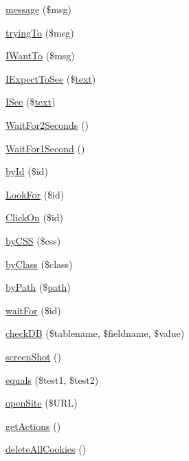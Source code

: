 \begin{DoxyCompactItemize}
\item 
\hyperlink{Tessa_8php_a37ab31c170417027f819bfc053d7cd39}{message} (\$msg)
\item 
\hyperlink{Tessa_8php_aa69ddc0af69161f83509e8b26c683e13}{trying\+To} (\$msg)
\item 
\hyperlink{Tessa_8php_a743872d307323bf8cef1cc94ed6324ee}{I\+Want\+To} (\$msg)
\item 
\hyperlink{Tessa_8php_a28ecccffe3517c38607586b303e312c1}{I\+Expect\+To\+See} (\$\hyperlink{Shape_8php_a37df362c2f77a0045fa8af094f432238}{text})
\item 
\hyperlink{Tessa_8php_a2cddd9ec74ad10a2e186f6ebadbae49b}{I\+See} (\$\hyperlink{Shape_8php_a37df362c2f77a0045fa8af094f432238}{text})
\item 
\hyperlink{Tessa_8php_a4408ae641f64cfc2e35afc782627f928}{Wait\+For2\+Seconds} ()
\item 
\hyperlink{Tessa_8php_a306f2b424894a2d9822b6413896ac843}{Wait\+For1\+Second} ()
\item 
\hyperlink{Tessa_8php_ab95005eff1f9e68fea369195c0bcfbd0}{by\+Id} (\$id)
\item 
\hyperlink{Tessa_8php_a6e436b807e73d7ec9d079fab9161cc21}{Look\+For} (\$id)
\item 
\hyperlink{Tessa_8php_a88614f7b70716a76a4272513e78f8ee8}{Click\+On} (\$id)
\item 
\hyperlink{Tessa_8php_ab8c3c1069483884b873b5081aa6d3b2c}{by\+C\+S\+S} (\$css)
\item 
\hyperlink{Tessa_8php_a30df4457cf7045bec2a81cfc1769377f}{by\+Class} (\$class)
\item 
\hyperlink{Tessa_8php_a0b6fd6f3b50bb6a75f821177055a853a}{by\+Path} (\$\hyperlink{Shape_8php_a3b05eec13add53df44e232273d718ae4}{path})
\item 
\hyperlink{Tessa_8php_a8cbd3ab64f5ba8c070f5762d8684aaa6}{wait\+For} (\$id)
\item 
\hyperlink{Tessa_8php_a45fa3c4912bbefca9353dab66fd5030e}{check\+D\+B} (\$tablename, \$fieldname, \$value)
\item 
\hyperlink{Tessa_8php_a8591279f3cd8873b7137558eefaf6315}{screen\+Shot} ()
\item 
\hyperlink{Tessa_8php_a9d4e10a0e20c1eb36b8077a8bbed8652}{equals} (\$test1, \$test2)
\item 
\hyperlink{Tessa_8php_a7ec3fd8ed495784662e9a082980a17ca}{open\+Site} (\$U\+R\+L)
\item 
\hyperlink{Tessa_8php_af5e5c4ed7fd27b8d801633f34a0d5bc1}{get\+Actions} ()
\item 
\hyperlink{Tessa_8php_a7c436dc08e51fc7a4a760a89a1b73541}{delete\+All\+Cookies} ()
\end{DoxyCompactItemize}
